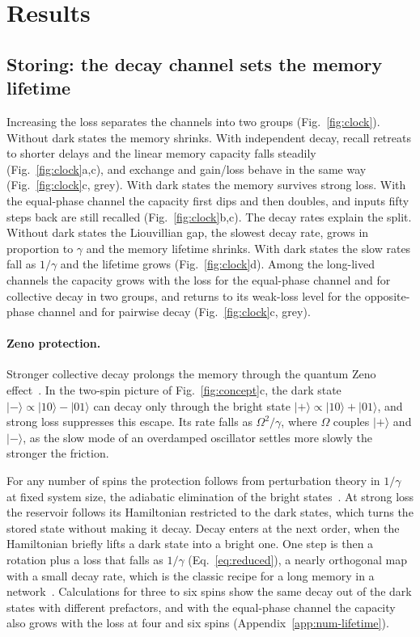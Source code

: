 \section{Results}
\label{sec:results}

\subsection{Storing: the decay channel sets the memory lifetime}
\label{sec:clock}
Increasing the loss separates the channels into two groups (Fig.~\ref{fig:clock}). Without dark states the memory
shrinks. With independent decay, recall retreats to shorter delays and the linear memory capacity falls steadily
(Fig.~\ref{fig:clock}a,c), and exchange and gain/loss behave in the same way (Fig.~\ref{fig:clock}c, grey). With dark
states the memory survives strong loss. With the equal-phase channel the capacity first dips and then doubles, and
inputs fifty steps back are still recalled (Fig.~\ref{fig:clock}b,c). The decay rates explain the split. Without
dark states the Liouvillian gap, the slowest decay rate, grows in proportion to $\gamma$ and the memory lifetime
shrinks. With dark states the slow rates fall as $1/\gamma$ and the lifetime grows (Fig.~\ref{fig:clock}d). Among
the long-lived channels the capacity grows with the loss for the equal-phase channel and for collective decay in two
groups, and returns to its weak-loss level for the opposite-phase channel and for pairwise decay (Fig.~\ref{fig:clock}c,
grey).

\paragraph{Zeno protection.}
Stronger collective decay prolongs the memory through the quantum Zeno
effect~\cite{Beige2000,FacchiPascazio2002}. In the two-spin picture of Fig.~\ref{fig:concept}c, the dark state
$|{-}\rangle\propto|10\rangle-|01\rangle$ can decay only through the bright state
$|{+}\rangle\propto|10\rangle+|01\rangle$, and strong loss suppresses this escape. Its rate falls as
$\Omega^2/\gamma$, where $\Omega$ couples $|{+}\rangle$ and $|{-}\rangle$, as the slow mode of an overdamped
oscillator settles more slowly the stronger the friction.

For any number of spins the protection follows from perturbation theory in $1/\gamma$ at fixed system size, the
adiabatic elimination of the bright states~\cite{Zanardi2014,Reiter2012}. At strong loss
the reservoir follows its Hamiltonian restricted to the dark states, which turns the stored state without making it
decay. Decay enters at the next order, when the Hamiltonian briefly lifts a dark state into a bright
one. One step is then a rotation plus a loss that falls as $1/\gamma$
(Eq.~\eqref{eq:reduced}), a nearly orthogonal map with a small decay rate, which is the classic recipe for a long
memory in a network~\cite{White2004}. Calculations for three to six spins show the same decay out of the dark states
with different prefactors, and with the equal-phase channel the capacity also grows with the loss at four and six
spins (Appendix~\ref{app:num-lifetime}).

